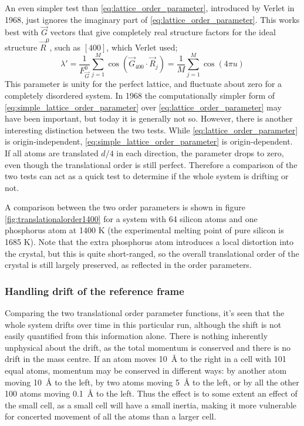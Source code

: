 \documentclass[11pt,bibliography=totoc,index=totoc]{scrbook}   %
\begin{document}
An even simpler test than \eqref{eq:lattice_order_parameter}, introduced by Verlet in 1968, just ignores the imaginary part of \eqref{eq:lattice_order_parameter}.\cite{Verlet:1968a}\cite[117]{Haile:1992} 
This works best with $\vec{G}$ vectors that give completely real structure factors for the ideal structure $\vec{R}^0$, such as $[400]$, which Verlet used;
\begin{equation}
    \lambda' = \frac{1}{F_{\vec{G}}^0} \sum_{j=1}^M \cos\left( \vec{G}_{400}\cdot\vec{R}_j \right) = \frac{1}{M}\sum_{j=1}^M \cos\left(4\pi u\right)
  \label{eq:simple_lattice_order_parameter}
\end{equation}
This parameter is unity for the perfect lattice, and fluctuate about zero for a completely disordered system.
In 1968 the computationally simpler form of \eqref{eq:simple_lattice_order_parameter} over \eqref{eq:lattice_order_parameter} may have been important, but today it is generally not so. 
However, there is another interesting distinction between the two tests. While \eqref{eq:lattice_order_parameter} is origin-independent, \eqref{eq:simple_lattice_order_parameter} is origin-dependent.
If all atoms are translated $d/4$ in each direction, the parameter drops to zero, even though the translational order is still perfect.
Therefore a comparison of the two tests can act as a quick test to determine if the whole system is drifting or not.

A comparison between the two order parameters is shown in figure \ref{fig:translationalorder1400} for a system
with 64 silicon atoms and one phosphorus atom at 1400 K (the experimental melting point of pure silicon is 1685 K).
Note that the extra phosphorus atom introduces a local distortion into the crystal, but this is quite short-ranged,
so the overall translational order of the crystal is still largely preserved, as reflected in the order parameters.

\subsubsection{Handling drift of the reference frame}

Comparing the two translational order parameter functions, it's seen that the whole system drifts over time in this particular run, although the shift is not easily quantified from this information alone. 
There is nothing inherently unphysical about the drift, as the total momentum is conserved and there is no drift in the mass centre.
If an atom moves 10~Å to the right in a cell with 101 equal atoms, momentum may be conserved in different ways: by another atom moving 10~Å to the left, by two atoms moving 5~Å to the left, or by all the other 100 atoms moving 0.1~Å to the left.
Thus the effect is to some extent an effect of the small cell, as a small cell will have a small inertia, making it more vulnerable for concerted movement of all the atoms than a larger cell.
\end{document}
